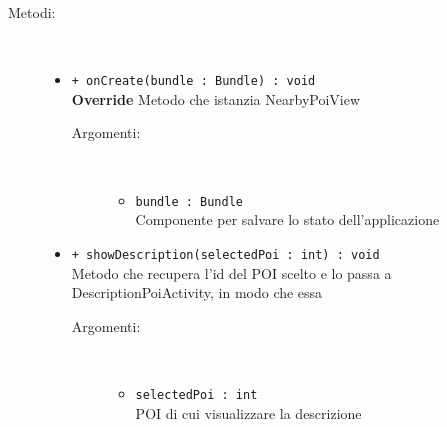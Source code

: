 \documentclass[../DefinizioneDiProdotto.tex]{subfiles}
\begin{document}
\begin{description}
\begin{itemize}
	\end{itemize}
	\item[Metodi:] \
	\begin{itemize}
		\item \texttt{+ onCreate(bundle : Bundle) : void}\\
		\textbf{Override} Metodo che istanzia NearbyPoiView
		\begin{description}
			\item[Argomenti:] \
			\begin{itemize}
				\item \texttt{bundle : Bundle}\\
				Componente per salvare lo stato dell'applicazione\end{itemize}
		\end{description}
		\item \texttt{+ showDescription(selectedPoi : int) : void}\\
		Metodo che recupera l'id del POI scelto e lo passa a DescriptionPoiActivity, in modo che essa
		\begin{description}
			\item[Argomenti:] \
			\begin{itemize}
				\item \texttt{selectedPoi : int}\\
				POI di cui visualizzare la descrizione\end{itemize}
		\end{description}
	\end{itemize}
\end{description}
\end{document}
